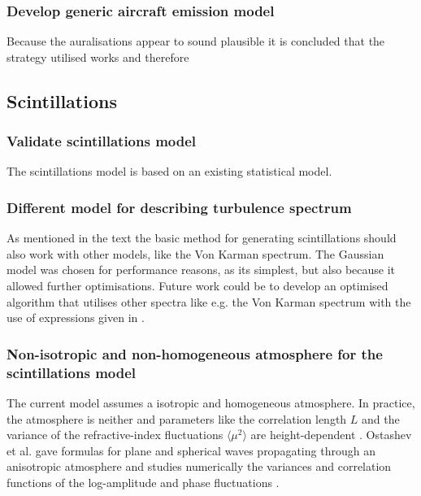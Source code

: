 \subsubsection*{Develop generic aircraft emission model}
Because the auralisations appear to sound plausible it is concluded that the strategy
utilised works and therefore


\subsection{Scintillations}

\subsubsection*{Validate scintillations model}
The scintillations model is based on an existing statistical model.

\subsubsection*{Different model for describing turbulence spectrum}
As mentioned in the text the basic method for generating scintillations should
also work with other models, like the Von Karman spectrum. The Gaussian model
was chosen for performance reasons, as its simplest, but also because it allowed
further optimisations. Future work could be to develop an optimised algorithm
that utilises other spectra like e.g. the Von Karman spectrum with the use of
expressions given in \cite{Ostashev2015}.

\subsubsection*{Non-isotropic and non-homogeneous atmosphere for the scintillations model}
The current model assumes a isotropic and homogeneous atmosphere. In practice,
the atmosphere is neither and parameters like the correlation length $L$ and the
variance of the refractive-index fluctuations $\langle \mu^2 \rangle$ are
height-dependent \cite{Krasnenko2013}. Ostashev et al. gave formulas for plane
\cite{Ostashev1997b} and spherical \cite{Ostashev1997c} waves propagating
through an anisotropic atmosphere and studies numerically the variances and
correlation functions of the log-amplitude and phase fluctuations
\cite{Ostashev2004}.

